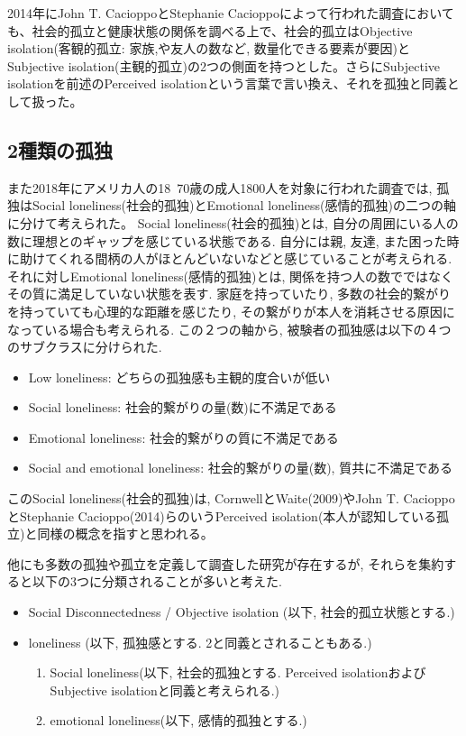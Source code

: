 \documentclass[a4paper,dvipdfmx]{hisken}
\begin{document}
2014年にJohn T. CacioppoとStephanie Cacioppoによって行われた調査においても、社会的孤立と健康状態の関係を調べる上で、社会的孤立はObjective isolation(客観的孤立: 家族,や友人の数など, 数量化できる要素が要因)とSubjective isolation(主観的孤立)の2つの側面を持つとした{}\cite{tex2}。さらにSubjective isolationを前述のPerceived isolationという言葉で言い換え、それを孤独と同義として扱った。

\subsection{2種類の孤独}

また2018年にアメリカ人の18~70歳の成人1800人を対象に行われた調査では, 孤独はSocial loneliness(社会的孤独)とEmotional loneliness(感情的孤独)の二つの軸に分けて考えられた{}\cite{tex3}。
Social loneliness(社会的孤独)とは, 自分の周囲にいる人の数に理想とのギャップを感じている状態である. 自分には親, 友達, また困った時に助けてくれる間柄の人がほとんどいないなどと感じていることが考えられる. それに対しEmotional loneliness(感情的孤独)とは, 関係を持つ人の数でではなくその質に満足していない状態を表す. 家庭を持っていたり, 多数の社会的繋がりを持っていても心理的な距離を感じたり, その繋がりが本人を消耗させる原因になっている場合も考えられる. 
この２つの軸から, 被験者の孤独感は以下の４つのサブクラスに分けられた. 
\begin{itemize}
\item Low loneliness: どちらの孤独感も主観的度合いが低い
\item Social loneliness: 社会的繋がりの量(数)に不満足である
\item Emotional loneliness:  社会的繋がりの質に不満足である
\item Social and emotional loneliness: 社会的繋がりの量(数), 質共に不満足である
\end{itemize}


このSocial loneliness(社会的孤独)は, CornwellとWaite(2009)やJohn T. CacioppoとStephanie Cacioppo(2014)らのいうPerceived isolation(本人が認知している孤立)と同様の概念を指すと思われる。

他にも多数の孤独や孤立を定義して調査した研究が存在するが, それらを集約すると以下の3つに分類されることが多いと考えた.
\begin{itemize}
\item Social Disconnectedness / Objective isolation (以下, 社会的孤立状態とする.)
\item loneliness (以下, 孤独感とする. 2と同義とされることもある.)
\begin{enumerate}
\item Social loneliness(以下, 社会的孤独とする. Perceived isolationおよびSubjective isolationと同義と考えられる.)
\item emotional loneliness(以下, 感情的孤独とする.)
\end{enumerate}
\end{itemize}
\end{document}
